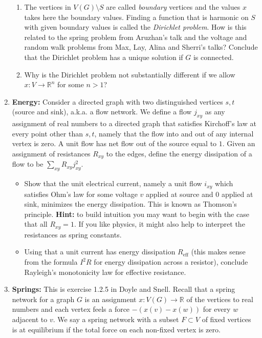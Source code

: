 \documentclass[11pt, oneside]{article}   	%
\newcommand{\RR}{\mathbb R}
\theoremstyle{definition}
\begin{document}
\begin{enumerate}
\begin{enumerate}
\item The vertices in $V(G) \setminus S$ are called \emph{boundary} vertices and the values $x$ takes here the boundary values. Finding a function that is harmonic on $S$ with given boundary values is called the \emph{Dirichlet problem}. How is this related to the spring problem from Aruzhan's talk and the voltage and random walk problems from Max, Lay, Alina and Sherri's talks? Conclude that the Dirichlet problem has a unique solution if $G$ is connected.
\item Why is the Dirichlet problem not substantially different if we allow $x:V \to \RR^n$ for some $n >1$? 
\end{enumerate}
\item \textbf{Energy: } Consider a directed graph with two distinguished vertices $s,t$ (source and sink), a.k.a. a flow network. We define a flow $j_{xy}$ as any assignment of real numbers to a directed graph that satisfies Kirchoff's law at every point other than $s,t$, namely that the flow into and out of any internal vertex is zero. A unit flow has net flow out of the source equal to $1$. Given an assignment of resistances $R_{xy}$ to the edges, define the energy dissipation of a flow to be $\sum_{xy} R_{xy} j_{xy}^2.$ 
\begin{itemize}
\item Show that the unit electrical current, namely a unit flow $i_{xy}$ which satisfies Ohm's law for some voltage $v$ applied at source and $0$ applied at sink, minimizes the energy dissipation. This is known as Thomson's principle. \textbf{Hint: } to build intuition you may want to begin with the case that all $R_{xy} = 1$. If you like physics, it might also help to interpret the resistances as spring constants.
\item Using that a unit current has energy dissipation $R_{\textrm{eff}}$ (this makes sense from the formula $I^2 R$ for energy dissipation across a resistor), conclude Rayleigh's monotonicity law for effective resistance.
\end{itemize}


\item \textbf{Springs:}
This is exercise 1.2.5 in Doyle and Snell. Recall that a spring network for a graph $G$ is an assignment $x:V(G) \to \RR$ of the vertices to real numbers and each vertex feels a force $ -(x(v) - x(w))$ for every $w$ adjacent to $v$. We say a spring network with a subset $F \subset V$ of fixed vertices is at equilibrium if the total force on each non-fixed vertex is zero. 


\end{enumerate}
\end{document}
